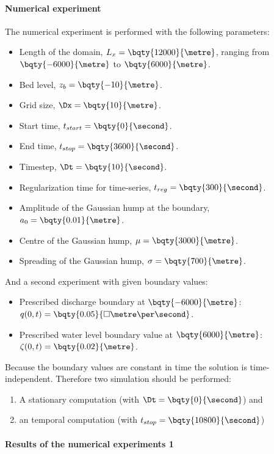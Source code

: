 \paragraph*{Numerical experiment}
The numerical experiment is performed with the following parameters:
\begin{itemize}
    \item Length of the domain, $L_x = \bqty{12000}{\metre}$, ranging from $\bqty{-6000}{\metre}$ to $\bqty{6000}{\metre}$.
    \item Bed level, $z_b = \bqty{-10}{\metre}$.
    \item Grid size, $\Dx = \bqty{10}{\metre}$.
    \item Start time, $t_{start} = \bqty{0}{\second}$.
    \item End time, $t_{stop} = \bqty{3600}{\second}$.
    \item Timestep, $\Dt = \bqty{10}{\second}$.
    \item Regularization time for time-series, $t_{reg} = \bqty{300}{\second}$.
    \item Amplitude of the Gaussian hump at the boundary, $a_0 = \bqty{0.01}{\metre}$.
    \item Centre of the Gaussian hump, $\mu = \bqty{3000}{\metre}$.
    \item Spreading of the Gaussian hump, $\sigma = \bqty{700}{\metre}$.
\end{itemize}
And a second experiment with given boundary values:
\begin{itemize}
    \item Prescribed discharge boundary at $\bqty{-6000}{\metre}$: $q(0,t) = \bqty{0.05}{\square\metre\per\second}$.
    \item Prescribed water level boundary value at $\bqty{6000}{\metre}$: $\zeta(0,t) = \bqty{0.02}{\metre}$.
\end{itemize}
Because the boundary values are constant in time the solution is time-independent.
Therefore two simulation should be performed:
\begin{enumerate}
    \item A stationary computation (with $\Dt = \bqty{0}{\second}$) and
    \item an temporal computation (with $t_{stop} = \bqty{10800}{\second}$)
\end{enumerate}
\paragraph*{Results of the numerical experiments 1}
\notyet
